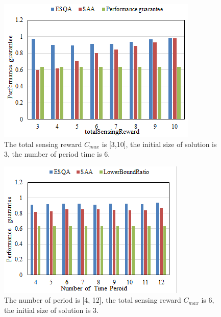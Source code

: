 \documentclass[journal]{IEEEtran}
\begin{document}
\begin{figure}
	\centering
	\includegraphics[width=1\linewidth]{Fig4(b).png}
	\caption{The total sensing reward $C_{max}$ is [3,10], the initial size of solution is 3, the number of period time is 6.}
	\label{fig:figure6}
\end{figure}
\begin{figure}
	\centering
	\includegraphics[width=1\linewidth]{Fig4(d).png}
	\caption{The number of period is [4, 12], the total sensing reward $C_{max}$ is 6, the initial size of solution is 3.}
	\label{fig:figure5}
\end{figure}
\end{document}
